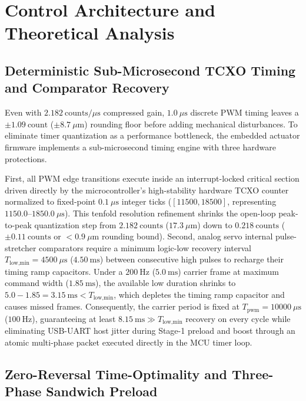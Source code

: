 \documentclass[journal]{IEEEtran}
\begin{document}
\section{Control Architecture and Theoretical Analysis}

\subsection{Deterministic Sub-Microsecond TCXO Timing and Comparator Recovery}

Even with $2.182\ \text{counts}/\mu\text{s}$ compressed gain, $1.0\ \mu\text{s}$ discrete PWM timing leaves a $\pm 1.09\ \text{count}$ ($\pm 8.7\ \mu\text{m}$) rounding floor before adding mechanical disturbances. To eliminate timer quantization as a performance bottleneck, the embedded actuator firmware implements a sub-microsecond timing engine with three hardware protections.

First, all PWM edge transitions execute inside an interrupt-locked critical section driven directly by the microcontroller's high-stability hardware TCXO counter normalized to fixed-point $0.1\ \mu\text{s}$ integer ticks ($[11500, 18500]$, representing $1150.0\text{--}1850.0\ \mu\text{s}$). This tenfold resolution refinement shrinks the open-loop peak-to-peak quantization step from $2.182\ \text{counts}$ ($17.3\ \mu\text{m}$) down to $0.218\ \text{counts}$ ($\pm 0.11\ \text{counts}$ or $< 0.9\ \mu\text{m}$ rounding bound). Second, analog servo internal pulse-stretcher comparators require a minimum logic-low recovery interval $T_{\text{low,min}} = 4500\ \mu\text{s}$ ($4.50\ \text{ms}$) between consecutive high pulses to recharge their timing ramp capacitors. Under a $200\ \text{Hz}$ ($5.0\ \text{ms}$) carrier frame at maximum command width ($1.85\ \text{ms}$), the available low duration shrinks to $5.0 - 1.85 = 3.15\ \text{ms} < T_{\text{low,min}}$, which depletes the timing ramp capacitor and causes missed frames. Consequently, the carrier period is fixed at $T_{\text{pwm}} = 10000\ \mu\text{s}$ ($100\ \text{Hz}$), guaranteeing at least $8.15\ \text{ms} \gg T_{\text{low,min}}$ recovery on every cycle while eliminating USB-UART host jitter during Stage-1 preload and boost through an atomic multi-phase packet executed directly in the MCU timer loop.

\subsection{Zero-Reversal Time-Optimality and Three-Phase Sandwich Preload}
\end{document}

